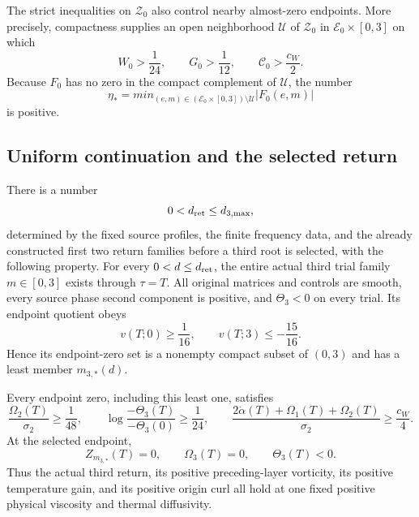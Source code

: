 The strict inequalities on $\mathcal Z_0$ also control nearby almost-zero
endpoints.  More precisely, compactness supplies an open neighborhood
$\mathcal U$ of $\mathcal Z_0$ in
$\mathcal E_0\times[0,3]$ on which
\begin{equation}\label{trc:near-root-margins}
 W_0>\frac1{24},\qquad G_0>\frac1{12},
 \qquad \mathcal C_0>\frac{c_W}{2}.
\end{equation}
Because $F_0$ has no zero in the compact complement of $\mathcal U$, the
number
\begin{equation}\label{trc:eta}
 \eta_*=min_{(e,m)\in
  (\mathcal E_0\times[0,3])\setminus\mathcal U}|F_0(e,m)|
\end{equation}
is positive.

\subsection{Uniform continuation and the selected return}

\begin{theorem}\label{trc:third-return}
There is a number
\[
 0<d_{\rm ret}\leq d_{3,\max},
\]
determined by the fixed source profiles, the finite frequency data, and
the already constructed first two return families before a third root is
selected, with the following property.  For every
$0<d\leq d_{\rm ret}$, the entire actual third trial family
$m\in[0,3]$ exists through $\tau=T$.  All original matrices and controls
are smooth, every source phase second component is positive, and
$\Theta_3<0$ on every trial.  Its endpoint quotient obeys
\begin{equation}\label{trc:diffusive-signs}
 v(T;0)\geq\frac1{16},\qquad
 v(T;3)\leq-\frac{15}{16}.
\end{equation}
Hence its endpoint-zero set is a nonempty compact subset of $(0,3)$ and
has a least member $m_{3,*}(d)$.

Every endpoint zero, including this least one, satisfies
\begin{equation}\label{trc:diffusive-root-bounds}
 \frac{\Omega_2(T)}{\sigma_2}\geq\frac1{48},\qquad
 \log\frac{-\Theta_3(T)}{-\Theta_3(0)}\geq\frac1{24},
 \qquad
 \frac{2\dot\alpha(T)+\Omega_1(T)+\Omega_2(T)}{\sigma_2}
       \geq\frac{c_W}{4}.
\end{equation}
At the selected endpoint,
\begin{equation}\label{trc:return-state}
 Z_{m_{3,*}}(T)=0,\qquad \Omega_3(T)=0,
 \qquad \Theta_3(T)<0.
\end{equation}
Thus the actual third return, its positive preceding-layer vorticity, its
positive temperature gain, and its positive origin curl all hold at one
fixed positive physical viscosity and thermal diffusivity.
\end{theorem}

